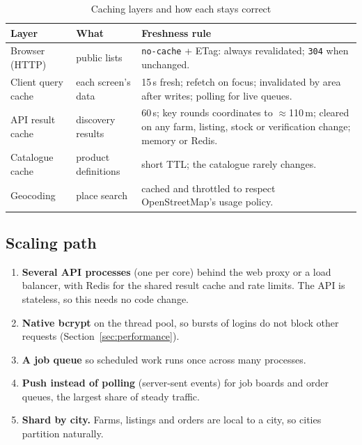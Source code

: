 \documentclass[manuscript,screen,review]{acmart}
\begin{document}
\begin{table}[htbp]
  \caption{Caching layers and how each stays correct}
  \label{tab:caching}
  \small
  \begin{tabularx}{\columnwidth}{@{}p{}p{}L@{}}
    \toprule
    \textbf{Layer} & \textbf{What} & \textbf{Freshness rule} \\
    \midrule
    Browser (HTTP) & public lists & \texttt{no-cache} + ETag: always revalidated; \texttt{304} when unchanged. \\
    Client query cache & each screen's data & 15\,s fresh; refetch on focus; invalidated by area after writes; polling for live queues. \\
    API result cache & discovery results & 60\,s; key rounds coordinates to $\approx$110\,m; cleared on any farm, listing, stock or verification change; memory or Redis. \\
    Catalogue cache & product definitions & short TTL; the catalogue rarely changes. \\
    Geocoding & place search & cached and throttled to respect OpenStreetMap's usage policy. \\
    \bottomrule
  \end{tabularx}
\end{table}

\subsection{Scaling path}

\begin{enumerate}
  \item \textbf{Several API processes} (one per core) behind the web proxy or a load balancer, with Redis for the shared result cache and rate limits. The API is stateless, so this needs no code change.
  \item \textbf{Native bcrypt} on the thread pool, so bursts of logins do not block other requests (Section~\ref{sec:performance}).
  \item \textbf{A job queue} so scheduled work runs once across many processes.
  \item \textbf{Push instead of polling} (server-sent events) for job boards and order queues, the largest share of steady traffic.
  \item \textbf{Shard by city.} Farms, listings and orders are local to a city, so cities partition naturally.
\end{enumerate}
\end{document}
